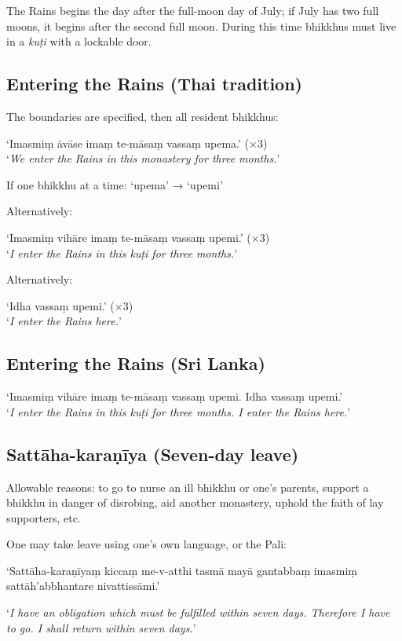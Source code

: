 The Rains begins the day after the full-moon day of July; if July has two full
moons, it begins after the second full moon. During this time bhikkhus must live
in a \emph{kuṭi} with a lockable door.

\subsection{Entering the Rains (Thai tradition)}

The boundaries are specified, then all resident bhikkhus:

‘Imasmiṃ āvāse imaṃ te-māsaṃ vassaṃ upema.’ (×3)\\
‘\emph{We enter the Rains in this monastery for three months.}’

If one bhikkhu at a time: ‘upema’ → ‘upemi’

Alternatively:

‘Imasmiṃ vihāre imaṃ te-māsaṃ vassaṃ upemi.’ (×3)\\
‘\emph{I enter the Rains in this kuṭi for three months.}’

Alternatively:

‘Idha vassaṃ upemi.’ (×3)\\
‘\emph{I enter the Rains here.}’


\subsection{Entering the Rains (Sri Lanka)}

‘Imasmiṃ vihāre imaṃ te-māsaṃ vassaṃ upemi. Idha vassaṃ upemi.’\\
‘\emph{I enter the Rains in this kuṭi for three months. I enter the Rains
  here.}’

\subsection{Sattāha-karaṇīya (Seven-day leave)}

Allowable reasons: to go to nurse an ill bhikkhu or one's parents, support a
bhikkhu in danger of disrobing, aid another monastery, uphold the faith of lay
supporters, etc.

One may take leave using one's own language, or the Pali:

‘Sattāha-karaṇīyaṃ kiccaṃ me-v-atthi tasmā mayā gantabbaṃ imasmiṃ
sattāh'abbhantare nivattissāmi.’

‘\emph{I have an obligation which must be fulfilled within seven days. Therefore
  I have to go. I shall return within seven days.}’


